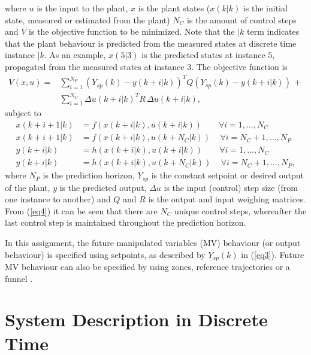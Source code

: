 \documentclass[12pt]{article}
\begin{document}
where $ u $ is the input to the plant, $ x $ is the plant states ($ x(k|k) $ is the initial state, measured or estimated from the plant) $N_C$ is the amount of control steps and $ V $ is the objective function to be minimized. Note that the $ |k $ term indicates that the plant behaviour is predicted from the measured states at discrete time instance $ |k $. As an example, $ x(5|3) $ is the predicted states at instance $5$, propagated from the measured states at instance $3$. The objective function is
\begin{equation}
\begin{aligned}
V(x,u) = &\sum_{i=1}^{N_P} (Y_{sp}(k)-y(k+i|k))^T Q (Y_{sp}(k)-y(k+i|k)) \,+\\ &\sum_{i=1}^{N_C} \Delta u(k+i|k)^T R \,\Delta u(k+i|k), \label{eq3}
\end{aligned}
\end{equation}
subject to
\begin{subequations}
	\begin{align}
	x(k+i+1|k) &= f(x(k+i|k),u(k+i|k)) \qquad \forall i = 1,...,N_C\\
	x(k+i+1|k) &= f(x(k+i|k),u(k+N_C|k)) \, \quad \forall i = N_C+1,...,N_P\\
	y(k+i|k) &= h(x(k+i|k),u(k+i|k)) \qquad \forall i = 1,...,N_C\\
	y(k+i|k) &= h(x(k+i|k),u(k+N_C|k)) \, \quad \forall i = N_C+1,...,N_P, \label{eq4d}
	\end{align}
	\label{eq4}
\end{subequations}
where $ N_P $ is the prediction horizon, $ Y_{sp} $ is the constant setpoint or desired output of the plant, $ y $ is the predicted output, $ \Delta u $ is the input (control) step size (from one instance to another) and $Q$ and $R$ is the output and input weighing matrices. From (\ref{eq4}) it can be seen that there are $N_C$ unique control steps, whereafter the last control step is maintained throughout the prediction horizon.

In this assignment, the future manipulated variables (MV) behaviour (or output behaviour) is specified using setpoints, as described by $ Y_{sp}(k) $ in (\ref{eq3}). Future MV behaviour can also be specified by using zones, reference trajectories or a funnel \cite{Qin.2003}.

\section{System Description in Discrete Time}
\end{document}
